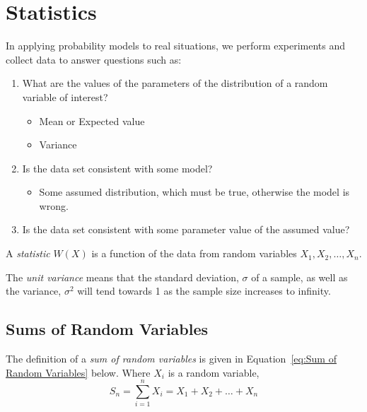 \section{Statistics} \label{sec:Statistics}
In applying probability models to real situations, we perform experiments and collect data to answer questions such as:
	\begin{enumerate}
		\item What are the values of the parameters of the distribution of a random variable of interest?
			\begin{itemize}[noitemsep, nolistsep]
				\item Mean or Expected value
				\item Variance
			\end{itemize}
		
		\item Is the data set consistent with some model?
			\begin{itemize}[noitemsep, nolistsep]
				\item Some assumed distribution, which must be true, otherwise the model is wrong.
			\end{itemize}
		
		\item Is the data set consistent with some parameter value of the assumed value?
	\end{enumerate}

	\begin{definition}[Statistic] \label{def:Statistic}
		A \emph{statistic} $W \left( X \right)$ is a function of the data from random variables $X_{1},X_{2},\ldots,X_{n}$.
	\end{definition}
	\begin{definition} \label{def:Unit Variance}
		The \emph{unit variance} means that the standard deviation, $\sigma$ of a sample, as well as the variance, $\sigma^{2}$ will tend towards 1 as the sample size increases to infinity.
	\end{definition}
	\subsection{Sums of Random Variables} \label{subsec:Sums of Random Variables}
		\begin{definition} \label{def:Sum of Random Variables}
			The definition of a \emph{sum of random variables} is given in Equation~\eqref{eq:Sum of Random Variables} below.
			Where $X_{i}$ is a random variable,
			\begin{equation} \label{eq:Sum of Random Variables}
				S_{n} = \sum_{i=1}^{n} X_{i} = X_{1} + X_{2} + \ldots + X_{n}
			\end{equation}
		\end{definition}
	
